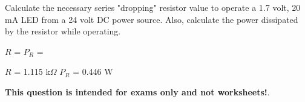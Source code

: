 

Calculate the necessary series "dropping" resistor value to operate a 1.7 volt, 20 mA LED from a 24 volt DC power source.  Also, calculate the power dissipated by the resistor while operating.

\vskip 10pt

$R$ = \hskip 50pt $P_R$ =







$R$ = 1.115 k$\Omega$  \hskip 30pt $P_R$ = 0.446 W







{\bf This question is intended for exams only and not worksheets!}.




